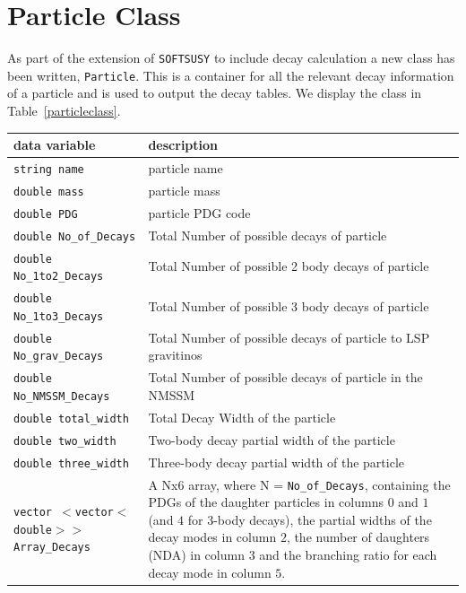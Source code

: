 \documentclass[final,3p,times]{elsarticle}
\def\code#1{{\tt #1}}
\begin{document}
\section{Particle Class} \label{sec:particle}
As part of the extension of \code{SOFTSUSY} to include decay calculation a
new class has been written, {\tt Particle}. This is a container for all the
relevant decay information of a particle and is used to output the decay
tables. We display the class in Table~\ref{particleclass}.


\begin{center}
\begin{table} %
\centering
\begin{tabular}{|C|D|} \hline
data variable & description \\ \hline
{\tt string name} & particle name \\ \hline
{\tt double mass} & particle mass \\ \hline
{\tt double PDG} & particle PDG code \\ \hline
{\tt double No{\_}of{\_}Decays} & Total Number of possible decays of particle \\ \hline
{\tt double No{\_}1to2{\_}Decays} & Total Number of possible 2 body decays of particle \\ \hline
{\tt double No{\_}1to3{\_}Decays} & Total Number of possible 3 body decays of particle \\ \hline
{\tt double No{\_}grav{\_}Decays} & Total Number of possible decays of particle to LSP gravitinos \\ \hline
{\tt double No{\_}NMSSM{\_}Decays} & Total Number of possible decays of particle in the NMSSM \\ \hline
{\tt double total{\_}width} & Total Decay Width of the particle \\ \hline
{\tt double two{\_}width} & Two-body decay partial width of the particle \\ \hline
{\tt double three{\_}width} & Three-body decay partial width of the particle \\ \hline
{\tt vector $<$vector$<$double$>>$ Array{\_}Decays} & A Nx6 array, where N = {\tt No{\_}of{\_}Decays}, containing the PDGs of the daughter particles in columns $0$ and $1$ (and $4$ for 3-body decays), the partial widths of the decay modes in column $2$, the number of daughters (NDA) in column $3$ and the branching ratio for each decay mode in column $5$. \\ \hline

\end{tabular}
\end{table}
\end{center}
\end{document}
